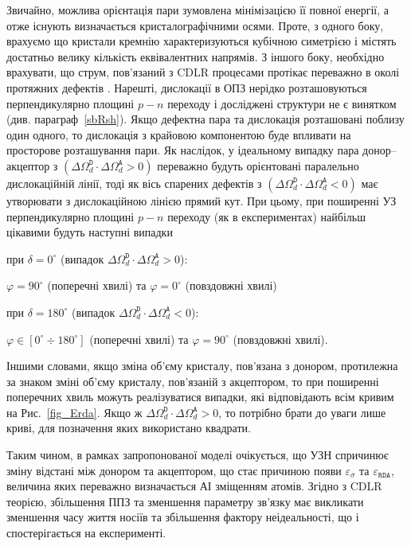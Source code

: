 Звичайно, можлива орієнтація пари зумовлена мінімізацією її повної енергії, а отже існують визначається кристалографічними осями.
Проте, з одного боку, врахуємо що кристали кремнію характеризуються кубічною симетрією і містять достатньо велику кількість еквівалентних напрямів.
З  іншого боку, необхідно врахувати,
що струм, пов'язаний з CDLR процесами протікає переважно в околі протяжних дефектів \cite{CDLR:JAP,CDLR:SSP}.
Нарешті, дислокації в ОПЗ нерідко розташовуються перпендикулярно площині $p-n$ переходу
і досліджені структури не є винятком (див. параграф~\ref{sbRsh}).
Якщо дефектна пара та дислокація розташовані поблизу один одного, то дислокація з крайовою компонентою буде впливати на просторове розташування пари.
Як наслідок, у ідеальному випадку пара донор--акцептор з  $(\Delta\Omega_d^\mathtt{D}\cdot\Delta\Omega_d^\mathtt{A}>0)$ переважно будуть орієнтовані
паралельно дислокаційній лінії,
тоді як вісь спарених дефектів з $(\Delta\Omega_d^\mathtt{D}\cdot\Delta\Omega_d^\mathtt{A}<0)$ має утворювати з дислокаційною лінією прямий кут.
При цьому, при поширенні УЗ перпендикулярно площині $p-n$ переходу (як в експериментах)
найбільш цікавими будуть наступні випадки

\noindent при  $\delta=0^\circ$ (випадок $\Delta\Omega_d^\mathtt{D}\cdot\Delta\Omega_d^\mathtt{A}>0$):
\begin{center}
\noindent   $\varphi=90^\circ$ (поперечні хвилі)  та $\varphi=0^\circ$ (повздовжні хвилі)
\end{center}

\noindent при  $\delta=180^\circ$ (випадок $\Delta\Omega_d^\mathtt{D}\cdot\Delta\Omega_d^\mathtt{A}<0$):
\begin{center}
\noindent   $\varphi\in[0^\circ\div 180^\circ]$ (поперечні хвилі)  та $\varphi=90^\circ$ (повздовжні хвилі).
\end{center}

Іншими словами,
якщо зміна об'єму кристалу, пов'язана з донором, протилежна за знаком зміні об'єму кристалу, пов'язаній з акцептором, то
при поширенні поперечних хвиль можуть реалізуватися випадки, які відповідають всім кривим на Рис.~\ref{fig_Erda}.
Якщо ж $\Delta\Omega_d^\mathtt{D}\cdot\Delta\Omega_d^\mathtt{A}>0$, то потрібно брати до уваги лише криві, для позначення
яких використано квадрати.


Таким чином, в рамках запропонованої моделі очікується, що УЗН спричинює зміну відстані між донором та акцептором,
що стає причиною появи $\varepsilon_{\sigma}$ та $\varepsilon_{\mathtt{RDA}}$, величина яких переважно визначається АІ зміщенням атомів.
Згідно з CDLR теорією,
збільшення ППЗ та зменшення параметру зв'язку має викликати зменшення часу життя носіїв та збільшення фактору неідеальності,
що і спостерігається на експерименті.


